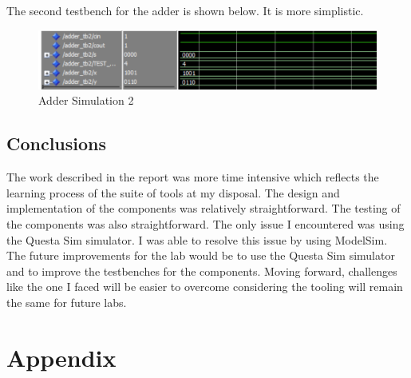 \documentclass{article}
\begin{document}
The second testbench for the adder is shown below. It is more simplistic.

\begin{figure}[H]
  \centering
  \includegraphics[scale=0.5]{adder_tb2.png}
  \caption{Adder Simulation 2}
\end{figure}

\subsection*{Conclusions}
The work described in the report was more time intensive which reflects the learning process of the suite of tools at my disposal. The design and implementation of the components was relatively straightforward. The testing of the components was also straightforward. The only issue I encountered was using the Questa Sim simulator. I was able to resolve this issue by using ModelSim. The future improvements for the lab would be to use the Questa Sim simulator and to improve the testbenches for the components. Moving forward, challenges like the one I faced will be easier to overcome considering the tooling will remain the same for future labs.

\appendix
\section*{Appendix}
\end{document}
